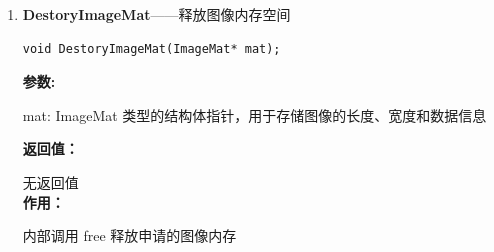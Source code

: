 \documentclass[12pt, a4paper, oneside]{ctexbook}
\begin{document}
\begin{enumerate}
			\item \textbf{DestoryImageMat}——释放图像内存空间
				\begin{lstlisting}[numbers=none]
void DestoryImageMat(ImageMat* mat);
				\end{lstlisting}
				\textbf{参数:} \par mat: ImageMat 类型的结构体指针，用于存储图像的长度、宽度和数据信息\par 
				\textbf{返回值：}\par 无返回值 \\
				\textbf{作用：}\par 内部调用 free 释放申请的图像内存 \\					
		\end{enumerate}

	
	
\end{document}
